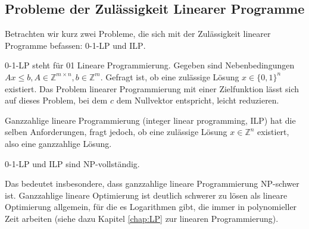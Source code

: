 \subsection{Probleme der Zulässigkeit Linearer Programme}
Betrachten wir kurz zwei Probleme, die sich mit der Zulässigkeit linearer Programme befassen: \textsc{0-1-LP} und \textsc{ILP}.

\textsc{0-1-LP} steht für 01 Lineare Programmierung. Gegeben sind Nebenbedingungen $Ax \le b, A \in \mathbb{Z}^{m \times n}, b \in \mathbb{Z}^m$. Gefragt ist, ob eine zulässige Lösung $x \in \{ 0,1 \}^n$ existiert. Das Problem linearer Programmierung mit einer Zielfunktion lässt sich auf dieses Problem, bei dem $c$ dem Nullvektor entspricht, leicht reduzieren.

Ganzzahlige lineare Programmierung (integer linear programming, \textsc{ILP}) hat die selben Anforderungen, fragt jedoch, ob eine zulässige Lösung $x \in \mathbb{Z}^n$ existiert, also eine ganzzahlige Lösung.

\begin{Satz}
  \hspace{\parindent}\textsc{0-1-LP} und \textsc{ILP} sind \textsf{NP}-vollständig.
\end{Satz}

Das bedeutet insbesondere, dass ganzzahlige lineare Programmierung \textsf{NP}-schwer ist. Ganzzahlige lineare Optimierung ist deutlich schwerer zu lösen als lineare Optimierung allgemein, für die es Logarithmen gibt, die immer in polynomieller Zeit arbeiten (siehe dazu Kapitel \ref{chap:LP} zur linearen Programmierung).

